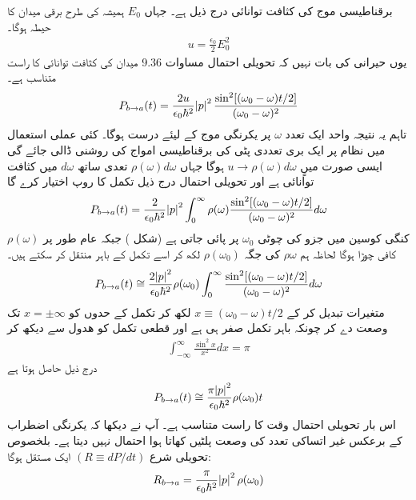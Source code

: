 برقناطیسی موج کی کثافت توانائی درج ذیل ہے۔ جہاں \(E_0\) ہمیشہ کی طرح برقی میدان کا حیطہ ہوگا۔
\begin{align}
	u = \frac{\epsilon_0}{2}E^2_0
\end{align}
یوں حیرانی کی بات نہیں کہ تحویلی احتمال مساوات \num{9.36} میدان کی کثافت توانائی کا راست متناسب ہے۔
\begin{align}
	P_{b\rightarrow a }(t) = \frac{2u}{\epsilon_0\hbar^2}\abs{p}^2 \frac{\sin^2[(\omega_0-\omega)t/2]}{(\omega_0-\omega)^2}
\end{align}
تاہم یہ نتیجہ واحد ایک تعدد \(\omega\) پر یکرنگی موج کے لیئے درست ہوگا۔ کئی عملی استعمال میں نظام پر ایک بری تعددی پٹی کی برقناطیسی امواج کی روشنی ڈالی جائے گی ایسی صورت میںٍ \(u\rightarrow\rho(\omega)d\omega\) ہوگا جہاں \(\rho(\omega)d\omega\) تعدی ساتھ \(d\omega\) میں کثافت توانائی ہے اور تحویلی احتمال درج ذیل تکمل کا روپ اختیار کرے گا
\begin{align}
	P_{b\rightarrow a}(t) = \frac{2}{\epsilon_0\hbar^2}\abs{p}^2\int_{0}^{\infty}\rho(\omega){\frac{\sin^2[(\omega_0-\omega)t/2]}{(\omega_0-\omega)^2}}d\omega
\end{align}
کنگی کوسین میں جزو کی چوٹی \(\omega_0\) پر پائی جاتی ہے   (شکل )  جبکہ عام طور پر \(\rho(\omega)\) کافی چوڑا ہوگا لحاظہ ہم \(\rho\omega\) کی جگہ \(\rho(\omega_0)\) لکھ کر اسے تکمل کے باہر منتقل کر سکتے ہیں۔
\begin{align}
	P_{b\rightarrow a}(t) \cong \frac{2\abs{p}^2}{\epsilon_0\hbar^2}\rho(\omega_0)\int_{0}^{\infty}\frac{\sin^2[(\omega_0-\omega)t/2]}{(\omega_0-\omega)^2}d\omega
\end{align}
متغیرات تبدیل کر کے \(x\equiv(\omega_0-\omega)t/2\) لکھ کر تکمل کے حدوں کو \(x = \pm\infty\) تک وصعت دے کر چونکہ باہر تکمل صفر ہی ہے اور قطعی تکمل کو ھدول سے دیکھ کر 
\begin{align}
	\int_{-\infty}^{\infty}\frac{\sin^2x}{x^2}dx = \pi
\end{align}
درج ذیل حاصل ہوتا ہے 
\begin{align}
	P_{b\rightarrow a}(t)\cong\frac{\pi\abs{p}^2}{\epsilon_0\hbar^2}\rho(\omega_0)t
\end{align}
اس بار تحویلی احتمال وقت  کا راست متناسب ہے۔ آپ نے دیکھا کہ یکرنگی اضطراب کے برعکس غیر اتساکی تعدد کی وصعت پلٹیں کھاتا ہوا احتمال نہیں دیتا ہے۔ بلخصوص تحویلی شرع \((R\equiv dP/dt)\) ایک مستقل ہوگا:
\begin{align}
	R_{b\rightarrow a} = \frac{\pi}{\epsilon_0\hbar^2}\abs{p}^2\rho(\omega_0)
\end{align}


